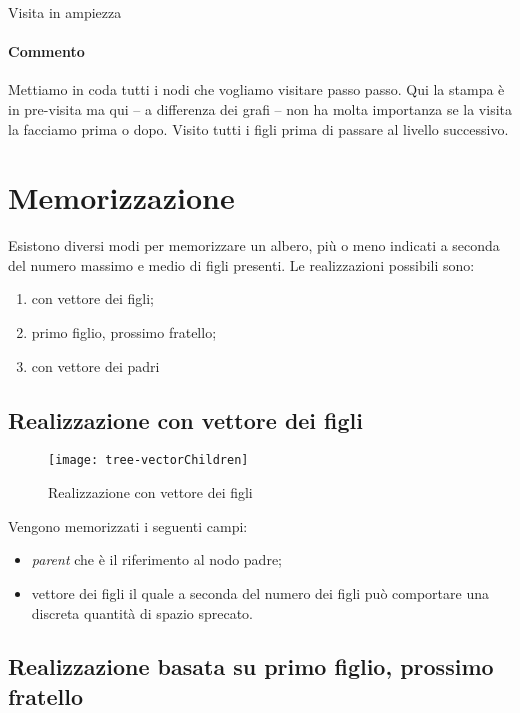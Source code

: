 \begin{algorithm}[H]
	\caption{Visita in ampiezza}
	
\end{algorithm}

\paragraph{Commento}
Mettiamo in coda tutti i nodi che vogliamo visitare passo passo.
Qui la stampa è in pre-visita ma qui -- a differenza dei grafi -- non ha molta importanza se la visita la facciamo prima o dopo.
Visito tutti i figli prima di passare al livello successivo.

\section{Memorizzazione}

Esistono diversi modi per memorizzare un albero, più o meno indicati a seconda del numero massimo e medio di figli presenti.
Le realizzazioni possibili sono:
\begin{enumerate}
	\item con vettore dei figli;
	\item primo figlio, prossimo fratello;
	\item con vettore dei padri
\end{enumerate}

\subsection{Realizzazione con vettore dei figli}

\begin{figure}[H]
	\centering
	\texttt{[image: tree-vectorChildren]}
	\caption[Realizzazione di un albero tramite vettore dei figli]{Realizzazione con vettore dei figli}
	\label{fig:tree-vector-children}
\end{figure}

Vengono memorizzati i seguenti campi:
\begin{itemize}
	\item \emph{parent} che è il riferimento al nodo padre;
	\item vettore dei figli il quale a seconda del numero dei figli può comportare una discreta quantità di spazio sprecato.
\end{itemize}

\subsection{Realizzazione basata su primo figlio, prossimo fratello}

